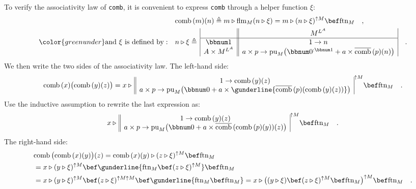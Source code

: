 To verify the associativity law of \lstinline!comb!, it is convenient
to express \lstinline!comb! through a helper function $\xi$:
\begin{align}
 & \text{comb}\,(m)(n)\triangleq m\triangleright\text{flm}_{M}(n\triangleright\xi)=m\triangleright(n\triangleright\xi)^{\uparrow M}\bef\text{ftn}_{M}\quad,\label{eq:comb-defined-via-helper-function-xi}\\
{\color{greenunder}\text{and }\xi\text{ is defined by}:}\quad & n\triangleright\xi\triangleq\,\begin{array}{|c||c|}
 & M^{L^{A}}\\
\hline \bbnum 1 & 1\rightarrow n\\
A\times M^{L^{A}} & a\times p\rightarrow\text{pu}_{M}\big(\bbnum 0^{:\bbnum 1}+a\times\overline{\text{comb}}\,(p)(n)\big)
\end{array}\quad.\nonumber 
\end{align}
We then write the two sides of the associativity law. The left-hand
side:
\[
\text{comb}\,(x)\big(\text{comb}\,(y)(z)\big)=x\triangleright\,\begin{array}{||c|}
1\rightarrow\text{comb}\,(y)(z)\\
a\times p\rightarrow\text{pu}_{M}\big(\bbnum 0+a\times\gunderline{\overline{\text{comb}}\,(p)(\text{comb}\,(y)(z))}\big)
\end{array}^{\uparrow M}\bef\text{ftn}_{M}\quad.
\]
Use the inductive assumption to rewrite the last expression as:
\[
x\triangleright\,\begin{array}{||c|}
1\rightarrow\text{comb}\,(y)(z)\\
a\times p\rightarrow\text{pu}_{M}\big(\bbnum 0+a\times\overline{\text{comb}}\,(\text{comb}\,(p)(y))(z)\big)
\end{array}^{\uparrow M}\bef\text{ftn}_{M}\quad.
\]
The right-hand side:
\begin{align*}
 & \text{comb}\,\big(\text{comb}\,(x)(y)\big)(z)=\text{comb}\,(x)(y)\triangleright(z\triangleright\xi)^{\uparrow M}\bef\text{ftn}_{M}\\
 & =x\triangleright(y\triangleright\xi)^{\uparrow M}\bef\gunderline{\text{ftn}_{M}\bef(z\triangleright\xi)^{\uparrow M}}\bef\text{ftn}_{M}\\
 & =x\triangleright(y\triangleright\xi)^{\uparrow M}\bef(z\triangleright\xi)^{\uparrow M\uparrow M}\bef\gunderline{\text{ftn}_{M}\bef\text{ftn}_{M}}=x\triangleright\big((y\triangleright\xi)\bef(z\triangleright\xi)^{\uparrow M}\bef\text{ftn}_{M}\big)^{\uparrow M}\bef\text{ftn}_{M}\quad.
\end{align*}
